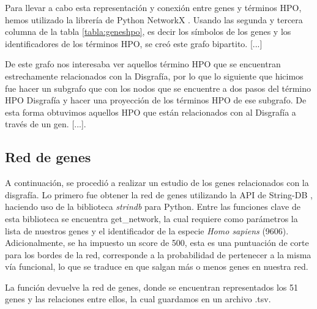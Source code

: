 Para llevar a cabo esta representación y conexión entre genes y términos HPO, hemos utilizado la librería de Python NetworkX \cite{BookNetworkX}. Usando las segunda y tercera columna de la tabla \ref{tabla:geneshpo}, es decir los símbolos de los genes y los identificadores de los términos HPO, se creó este grafo bipartito. [...]

De este grafo nos interesaba ver aquellos término HPO que se encuentran estrechamente relacionados con la Disgrafía, por lo que lo siguiente que hicimos fue hacer un subgrafo que con los nodos que se encuentre a dos pasos del término HPO Disgrafía y hacer una proyección de los términos HPO de ese subgrafo. De esta forma obtuvimos aquellos HPO que están relacionados con al Disgrafía a través de un gen. [...].

\subsection{Red de genes}

A continuación, se procedió a realizar un estudio de los genes relacionados con la disgrafía. Lo primero fue obtener la red de genes utilizando la API de String-DB \cite{String2021}, haciendo uso de la biblioteca \textit{strindb} para Python. Entre las funciones clave de esta biblioteca se encuentra get\_network, la cual requiere como parámetros la lista de nuestros genes y el identificador de la especie \textit{Homo sapiens} (9606). Adicionalmente, se ha impuesto un score de 500, esta es una puntuación de corte para los bordes de la red, corresponde a la probabilidad de pertenecer a la misma vía funcional, lo que se traduce en que salgan más o menos genes en nuestra red.

La función devuelve la red de genes, donde se encuentran representados los 51 genes y las relaciones entre ellos, la cual guardamos en un archivo .tsv.
